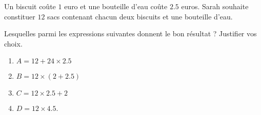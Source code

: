 
\begin{exercice}\label{exosmath-0885}

    Un biscuit coûte \( 1\) euro et une bouteille d'eau coûte \( 2.5\) euros. Sarah souhaite constituer \( 12\) sacs contenant chacun deux biscuits et une bouteille d'eau. 

            Lesquelles parmi les expressions suivantes donnent le bon résultat ? Justifier vos choix.
            \begin{enumerate}
                \item
                    \( A=12+24\times 2.5\)
                \item
                    \( B=12\times (   2+2.5 )\)
                \item
                    \( C=12\times 2.5+2\)
                \item
                    \( D=12\times 4.5\).
            \end{enumerate}

\end{exercice}
